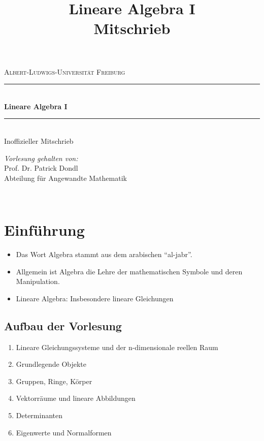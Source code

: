 \documentclass{report}
\title{Lineare Algebra I\\Mitschrieb}
\theoremstyle{customrem}
\theoremstyle{customdef}
\begin{document}
\begin{titlepage}
	\newcommand{\HRule}{\rule{\linewidth}{0.5mm}}
	\center
	\vspace{6cm}
	\textsc{\large Albert-Ludwigs-Universität Freiburg}\\[0.5cm] 
	\vspace{4cm}
	\HRule \\[0.8cm]
	{ \huge \bfseries Lineare Algebra $\mathbf{I}$}\\[0.4cm] 
	\HRule \\[.5cm]
	\Large Inoffizieller Mitschrieb
	\\[13.5cm]
	\begin{minipage}{0.5\textwidth}
		\begin{center} \large
			\emph{Vorlesung gehalten von:}\\[1cm]
			Prof. Dr. Patrick Dondl\\
			Abteilung für Angewandte Mathematik\\
		\end{center}
	\end{minipage}\\[2.5cm]
	\thispagestyle{empty}
\end{titlepage}


\section*{Einführung}
\begin{itemize}
\item{Das Wort Algebra stammt aus dem arabischen "`al-jabr"'.}
\item{Allgemein ist Algebra die Lehre der mathematischen Symbole und deren Manipulation.}
\item{Lineare Algebra: Insbesondere lineare Gleichungen}
\end{itemize}

\subsection*{Aufbau der Vorlesung}
\begin{enumerate}
\item{Lineare Gleichungssysteme und der n-dimensionale reellen Raum}
\item{Grundlegende Objekte}
\item{Gruppen, Ringe, Körper}
\item{Vektorräume und lineare Abbildungen}
\item{Determinanten}
\item{Eigenwerte und Normalformen}
\end{enumerate}
\end{document}
